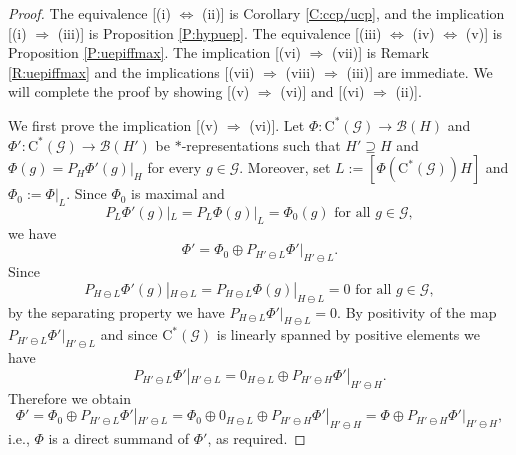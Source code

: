 \documentclass[10pt,a4paper]{amsart}
\newcommand{\B}{{\mathcal{B}}}
\newcommand{\G}{{\mathcal{G}}}
\newcommand{\ca}{\mathrm{C}^*}
\newcommand{\foral}{\text{ for all }}
\begin{document}
\begin{proof}
The equivalence [(i) $\Leftrightarrow$ (ii)] is Corollary \ref{C:ccp/ucp}, and the implication [(i) $\Rightarrow$ (iii)] is Proposition \ref{P:hypuep}. The equivalence [(iii) $\Leftrightarrow$ (iv) $\Leftrightarrow$ (v)] is Proposition \ref{P:uepiffmax}.
The implication [(vi) $\Rightarrow$ (vii)] is Remark \ref{R:uepiffmax} and the implications [(vii) $\Rightarrow$ (viii) $\Rightarrow$ (iii)] are immediate.
We will complete the proof by showing [(v) $\Rightarrow$ (vi)] and [(vi) $\Rightarrow$ (ii)].

We first prove the implication [(v) $\Rightarrow$ (vi)]. Let $\Phi\colon \ca(\G) \to \B(H)$ and $\Phi'\colon \ca(\G)\to\B(H')$ be $*$-representations such that $H'\supseteq H$ and $\Phi(g)=P_H\Phi'(g)|_H$ for every $g\in\G$.
Moreover, set $L:=[\Phi(\ca(\G))H]$ and $\Phi_0:=\Phi|_L$.
Since $\Phi_0$ is maximal and
\[
P_L \Phi'(g)|_L = P_L \Phi(g)|_L = \Phi_0(g) \foral g \in \G,
\]
we have
\[
\Phi' = \Phi_0 \oplus P_{H' \ominus L} \Phi' |_{H' \ominus L}.
\]
Since
\[
P_{H \ominus L} \Phi'(g) |_{H \ominus L}
=
P_{H \ominus L} \Phi(g) |_{H \ominus L}
=
0
\foral g \in \G,
\]
by the separating property we have $P_{H \ominus L} \Phi' |_{H \ominus L} = 0$.
By positivity of the map $P_{H' \ominus L} \Phi' |_{H' \ominus L}$ and since $\ca(\G)$ is linearly spanned by positive elements we have
\[
P_{H' \ominus L} \Phi' |_{H' \ominus L} = 0_{H \ominus L} \oplus P_{H' \ominus H} \Phi' |_{H' \ominus H}.
\]
Therefore we obtain
\[
\Phi'
= \Phi_0 \oplus P_{H' \ominus L} \Phi' |_{H' \ominus L}
= \Phi_0 \oplus 0_{H \ominus L} \oplus P_{H' \ominus H} \Phi' |_{H' \ominus H}
= \Phi \oplus P_{H' \ominus H} \Phi' |_{H' \ominus H},
\]
i.e., $\Phi$ is a direct summand of $\Phi'$, as required.


\end{proof}
\end{document}

